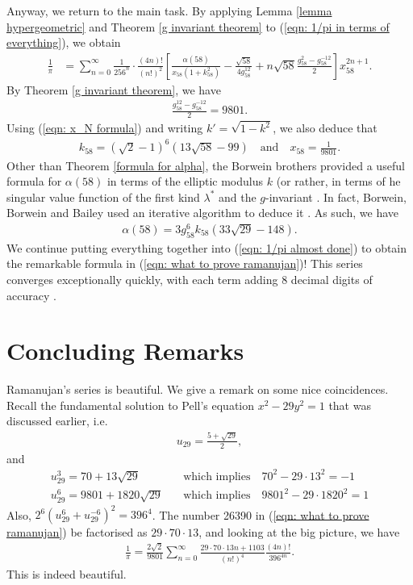 \documentclass[11pt]{amsart}
\theoremstyle{definition}
\numberwithin{theorem}{section}
\begin{document}
Anyway, we return to the main task. By applying Lemma \ref{lemma hypergeometric} and Theorem \ref{g invariant theorem} to (\ref{eqn: 1/pi in terms of everything}), we obtain \begin{align}\label{eqn: 1/pi almost done}
    \frac{1}{\pi}&=\sum_{n=0}^{\infty}\frac{1}{256^n}\cdot \frac{\left(4n\right)!}{\left(n!\right)^2}\left[\frac{\alpha\left(58\right)}{x_{58}\left(1+k_{58}^2\right)}-\frac{\sqrt{58}}{4g_{58}^{12}}+n\sqrt{58} \frac{g_{58}^2-g_{58}^{-12}}{2}\right]x_{58}^{2n+1}.
\end{align}
By Theorem \ref{g invariant theorem}, we have \begin{align*}
    \frac{g_{58}^{12}-g_{58}^{-12}}{2}=9801.
\end{align*}
Using (\ref{eqn: x_N formula}) and writing $k'=\sqrt{1-k^2}$, we also deduce that \begin{align*}
    k_{58}=(\sqrt{2}-1)^6(13\sqrt{58}-99)\quad\text{and}\quad x_{58}=\frac{1}{9801}.
\end{align*}
Other than Theorem \ref{formula for alpha}, the Borwein brothers provided a useful formula for $\alpha\left(58\right)$ in terms of the elliptic modulus $k$ (or rather, in terms of he singular value function of the first kind $\lambda^\ast$ and the $g$-invariant \cite{pi and the agm}. In fact, Borwein, Borwein and Bailey used an iterative algorithm to deduce it \cite{Borwein Pi Alpha}. As such, we have \begin{align*}
    \alpha\left(58\right)=3g_{58}^6k_{58}(33\sqrt{29}-148).
\end{align*}
We continue putting everything together into (\ref{eqn: 1/pi almost done}) to obtain the remarkable formula in (\ref{eqn: what to prove ramanujan})! This series converges exceptionally quickly, with each term adding 8 decimal digits of accuracy \cite{wong}.
\section{Concluding Remarks}
Ramanujan's series is beautiful. We give a remark on some nice coincidences. Recall the fundamental solution to Pell's equation $x^2-29y^2=1$ that was discussed earlier, i.e. \begin{align*}
    u_{29}=\frac{5+\sqrt{29}}{2},
\end{align*}
and \begin{align*}
    u_{29}^3=70+13\sqrt{29}\quad&\text{which implies}\quad 70^2-29\cdot 13^2=-1 \\
    u_{29}^6=9801+1820\sqrt{29}\quad&\text{which implies}\quad 9801^2-29\cdot 1820^2=1
\end{align*}
Also, $2^6\left(u_{29}^6+u_{29}^{-6}\right)^2=396^4$. The number 26390 in (\ref{eqn: what to prove ramanujan}) be factorised as $29\cdot 70\cdot 13$, and looking at the big picture, we have 
\begin{align*}
    \frac{1}{\pi}=\frac{2\sqrt{2}}{9801}\sum_{n=0}^{\infty}\frac{29\cdot 70\cdot 13n+1103}{\left(n!\right)^4}\frac{\left(4n\right)!}{396^{4n}}.
\end{align*} 
This is indeed beautiful.
\end{document}
